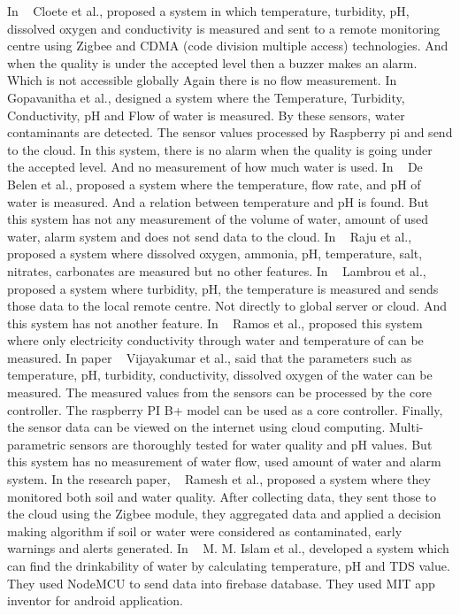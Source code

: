 In ~\cite{cloete2016design} Cloete et al., proposed a system in which temperature, turbidity, pH, dissolved oxygen and
conductivity is measured and sent to a remote monitoring centre using Zigbee and CDMA (code
division multiple access) technologies. And when the quality is under the accepted level then a
buzzer makes an alarm. Which is not accessible globally Again there is no flow measurement.
In ~\cite{gopavanitha2017low} Gopavanitha et al., designed a system where the Temperature, Turbidity, Conductivity, pH and Flow of water is measured. By these sensors, water contaminants are detected. The sensor values processed by Raspberry pi and
send to the cloud. In this system, there is no alarm when the quality is going under the accepted level. And no measurement of how much water is used.
In ~\cite{de2017water} De Belen et al., proposed a system where the temperature, flow rate, and pH of water is measured. And a relation between temperature and pH is found. 
But this system has not any measurement of the volume of water, amount of used water, alarm system and does not send data to the cloud.
In ~\cite{raju2017knowledge} Raju et al., proposed a system where dissolved oxygen, ammonia, pH, temperature, salt, nitrates, carbonates are measured but no other features.
In ~\cite{lambrou2012low} Lambrou et al., proposed a system where turbidity, pH, the temperature is measured and sends those data to the local remote centre. Not directly to global server or cloud. And this system has not another feature.
In ~\cite{ramos2008four} Ramos et al., proposed this system where only electricity conductivity through water and temperature of can be measured. 
In paper ~\cite{vijayakumar2015real} Vijayakumar et al., said that the parameters such as temperature, pH, turbidity, conductivity, dissolved oxygen of the water can be measured. The measured values from the sensors can be processed by the core controller. The raspberry PI B+ model can be used as a core controller. Finally, the sensor data can be viewed on the internet using cloud computing. Multi-parametric sensors are thoroughly tested for water quality and pH values. But this system has no measurement of water flow, used amount of water and alarm system.
In the research paper, ~\cite{ramesh2017water} Ramesh et al., proposed a system where they monitored both soil and water quality. After collecting data, they sent those to the cloud using the Zigbee module, they aggregated data and applied a decision making algorithm if soil or water were considered as contaminated, early warnings and alerts generated.
In ~\cite{islam2020developing} M. M. Islam et al., developed a system which can find the drinkability of water by calculating temperature, pH and TDS value. They used NodeMCU to send data into firebase database. They used MIT app inventor for android application.


